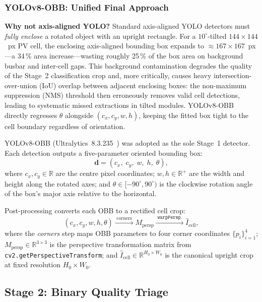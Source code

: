 \documentclass[conference]{IEEEtran}
\begin{document}
\subsubsection{YOLOv8-OBB: Unified Final Approach}
\label{sec:yolo}

\textbf{Why not axis-aligned YOLO?} Standard axis-aligned YOLO detectors must \textit{fully enclose} a rotated object with an upright rectangle. For a $10^\circ$-tilted $144\times144$~px PV cell, the enclosing axis-aligned bounding box expands to $\approx$$\!167\times167$~px---a 34\,\% area increase---wasting roughly 25\,\% of the box area on background busbar and inter-cell gaps. This background contamination degrades the quality of the Stage~2 classification crop and, more critically, causes heavy intersection-over-union (IoU) overlap between adjacent enclosing boxes: the non-maximum suppression (NMS) threshold then erroneously removes valid cell detections, leading to systematic missed extractions in tilted modules. YOLOv8-OBB directly regresses $\theta$ alongside $(c_x, c_y, w, h)$, keeping the fitted box tight to the cell boundary regardless of orientation.

YOLOv8-OBB (Ultralytics~8.3.235~\cite{jocher2023}) was adopted as the sole Stage~1 detector. Each detection outputs a five-parameter oriented bounding box:
\begin{equation}
  \mathbf{d} = (c_x,\; c_y,\; w,\; h,\; \theta),
  \label{eq:obb}
\end{equation}
where $c_x, c_y \in \mathbb{R}$ are the centre pixel coordinates; $w, h \in \mathbb{R}^{+}$ are the width and height along the rotated axes; and $\theta \in [-90^\circ, 90^\circ)$ is the clockwise rotation angle of the box's major axis relative to the horizontal.

Post-processing converts each OBB to a rectified cell crop:
\begin{equation}
  (c_x, c_y, w, h, \theta)
  \xrightarrow{\;\text{corners}\;}
  M_{\text{persp}}
  \xrightarrow{\;\texttt{warpPersp.}\;}
  \hat{I}_{\text{cell}},
  \label{eq:postproc}
\end{equation}
where the \textit{corners} step maps OBB parameters to four corner coordinates $\{p_i\}_{i=1}^{4}$; $M_{\text{persp}} \in \mathbb{R}^{3\times3}$ is the perspective transformation matrix from \texttt{cv2.getPerspectiveTransform}; and $\hat{I}_{\text{cell}} \in \mathbb{R}^{H_0 \times W_0}$ is the canonical upright crop at fixed resolution $H_0 \times W_0$.

\subsection{Stage 2: Binary Quality Triage}
\label{sec:stage2}
\end{document}
